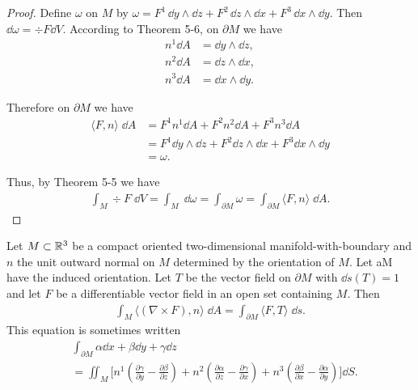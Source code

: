 \begin{proof}
    Define $\omega$ on $M$ by $\omega=F^1\,\dd y\wedge\dd z + F^2\,\dd z\wedge\dd x + F^3\,\dd x\wedge\dd y$.
    Then $\dd\omega = \div F\dd V$. According to Theorem 5-6, on $\partial M$ we have 
    \begin{align*}
        n^1\dd A & = \dd y\wedge \dd z,\\
        n^2\dd A & = \dd z\wedge \dd x,\\
        n^3\dd A & = \dd x\wedge \dd y.
    \end{align*}

    Therefore on $\partial M$ we have 
    \begin{align*}
        \langle F,n\rangle\;\dd A 
        & = F^1n^1\dd A + F^2n^2\dd A + F^3n^3\dd A \\
        & = F^1\dd y\wedge \dd z + F^2\dd z\wedge \dd x + F^3\dd x\wedge \dd y \\
        & = \omega.
    \end{align*}

    Thus, by Theorem 5-5 we have
    \begin{align*}
        \int_M\div F\;\dd V
        = \int_M\;\dd\omega
        = \int_{\partial M}\omega
        = \int_{\partial M}\langle F,n\rangle\;\dd A.
    \end{align*}
\end{proof}

\begin{theorem}
    Let $M\subset\mathbb{R}^3$ be a compact oriented two-dimensional manifold-with-boundary and $n$ the
    unit outward normal on $M$ determined by the orientation of $M$. Let aM have the induced orientation.
    Let $T$ be the vector field on $\partial M$ with $\dd s(T) = 1$ and let $F$ be a differentiable 
    vector field in an open set containing $M$. Then
    \begin{align*}
      \int_{M}\langle (\nabla\times F), n\rangle\;\dd A = \int_{\partial M}\langle F,T\rangle\;\dd s.
    \end{align*}
    This equation is sometimes written
    \begin{align*}
        & \int_{\partial M}\alpha \dd x+\beta\dd y+\gamma\dd z \\
        & = \iint_{M}\bigg[
            n^1\left(\frac{\partial\gamma}{\partial y}-\frac{\partial\beta}{\partial z}\right)
            + n^2\left(\frac{\partial\alpha}{\partial z}-\frac{\partial\gamma}{\partial x}\right)
            + n^3\left(\frac{\partial\beta}{\partial x}-\frac{\partial\alpha}{\partial y}\right)
            \bigg]\dd S.
    \end{align*}
\end{theorem}

